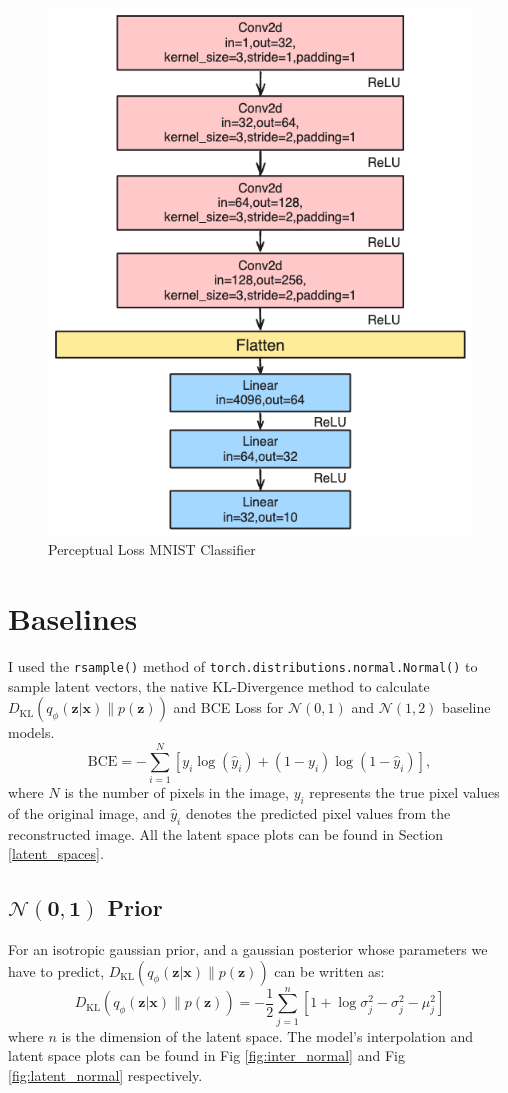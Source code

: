 \documentclass[12pt]{article}
\begin{document}
\begin{figure}[h]
\centering
\includegraphics[width=0.5\linewidth]{report_images/classifier.png}
\caption{\label{fig:classifier}Perceptual Loss MNIST Classifier}
\end{figure}

\section{Baselines}
I used the \texttt{rsample()} method of \texttt{torch.distributions.normal.Normal()} to sample latent vectors, the native KL-Divergence method to calculate $D_{\text{KL}}(q_\phi(\mathbf{z}|\mathbf{x}) \| p(\mathbf{z}))$ and BCE Loss for $\mathcal{N}(0,1)$ and $\mathcal{N}(1,2)$ baseline models.
\begin{equation}
\text{BCE} = -\sum_{i=1}^{N} \left[ y_i \log(\hat{y}_i) + (1 - y_i) \log(1 - \hat{y}_i) \right],
\end{equation}
where \(N\) is the number of pixels in the image, \(y_i\) represents the true pixel values of the original image, and \(\hat{y}_i\) denotes the predicted pixel values from the reconstructed image. All the latent space plots can be found in Section \ref{latent_spaces}.

\subsection{$\boldsymbol{\mathcal{N}(0,1)}$ Prior}
For an isotropic gaussian prior, and a gaussian posterior whose parameters we have to predict, $D_{\text{KL}}(q_\phi(\mathbf{z}|\mathbf{x}) \| p(\mathbf{z}))$ can be written as:
\begin{equation}
D_{\text{KL}}(q_\phi(\mathbf{z}|\mathbf{x}) \| p(\mathbf{z})) = -\frac{1}{2} \sum_{j=1}^{n} \left[1 + \log\sigma_j^2 - \sigma_j^2 - \mu_j^2  \right]
\end{equation}
where $n$ is the dimension of the latent space.  The model's interpolation and latent space plots can be found in Fig \ref{fig:inter_normal} and Fig \ref{fig:latent_normal} respectively. 
\end{document}
